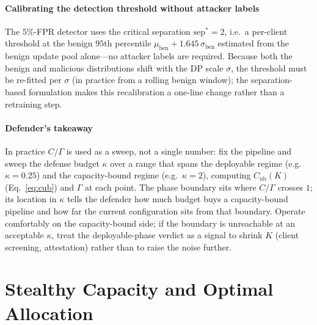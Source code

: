 \documentclass[final,1p,times]{elsarticle}
\begin{document}
\paragraph{Calibrating the detection threshold without attacker labels}
The $5\%$-FPR detector uses the critical separation
$\mathrm{sep}^*{=}2$, i.e.\ a per-client threshold at the benign
$95$th percentile $\mu_{\mathrm{ben}}{+}1.645\,\sigma_{\mathrm{ben}}$
estimated from the benign update pool alone---no attacker labels are
required. Because both the benign and malicious distributions shift with
the DP scale $\sigma$, the threshold must be re-fitted per $\sigma$ (in
practice from a rolling benign window); the separation-based formulation
makes this recalibration a one-line change rather than a retraining step.

\paragraph{Defender's takeaway}
In practice $C/\Gamma$ is used as a sweep, not a single number: fix the
pipeline and sweep the defense budget $\kappa$ over a range that spans
the deployable regime (e.g.\ $\kappa{=}0.25$) and the capacity-bound
regime (e.g.\ $\kappa{=}2$), computing $C_{\mathrm{ub}}(K)$
(Eq.~\ref{eq:cub}) and $\Gamma$ at each point. The phase boundary sits
where $C/\Gamma$ crosses $1$; its location in $\kappa$ tells the
defender how much budget buys a capacity-bound pipeline and how far the
current configuration sits from that boundary. Operate comfortably on
the capacity-bound side; if the boundary is unreachable at an acceptable
$\kappa$, treat the deployable-phase verdict as a signal to shrink $K$
(client screening, attestation) rather than to raise the noise further.

\section{Stealthy Capacity and Optimal Allocation}
\end{document}
